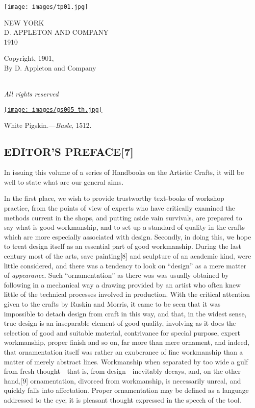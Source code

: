 \documentclass[
]{article}
\begin{document}
\texttt{[image: images/tp01.jpg]}

NEW YORK\\
D. APPLETON AND COMPANY\\
1910

{Copyright, 1901,\\
By D. Appleton and Company}\\
\strut \\
\emph{All rights reserved}

\href{images/gs005.jpg}{\texttt{[image: images/gs005\_th.jpg]}}

{White Pigskin.}---\emph{Basle}, 1512.

\hypertarget{editors-preface7}{%
\subsection[EDITOR'S
PREFACE]{\texorpdfstring{\protect\hypertarget{EDITORS_PREFACE}{}{}EDITOR'S
PREFACE{\protect\hypertarget{Page_7}{}{{[}7{]}}}}{EDITOR'S PREFACE{[}7{]}}}\label{editors-preface7}}

{In} issuing this volume of a series of Handbooks on the Artistic
Crafts, it will be well to state what are our general aims.

In the first place, we wish to provide trustworthy text-books of
workshop practice, from the points of view of experts who have
critically examined the methods current in the shops, and putting aside
vain survivals, are prepared to say what is good workmanship, and to set
up a standard of quality in the crafts which are more especially
associated with design. Secondly, in doing this, we hope to treat design
itself as an essential part of good workmanship. During the last century
most of the arts, save painting{\protect\hypertarget{Page_8}{}{{[}8{]}}}
and sculpture of an academic kind, were little considered, and there was
a tendency to look on ``design'' as a mere matter of \emph{appearance}.
Such ``ornamentation'' as there was was usually obtained by following in
a mechanical way a drawing provided by an artist who often knew little
of the technical processes involved in production. With the critical
attention given to the crafts by Ruskin and Morris, it came to be seen
that it was impossible to detach design from craft in this way, and
that, in the widest sense, true design is an inseparable element of good
quality, involving as it does the selection of good and suitable
material, contrivance for special purpose, expert workmanship, proper
finish and so on, far more than mere ornament, and indeed, that
ornamentation itself was rather an exuberance of fine workmanship than a
matter of merely abstract lines. Workmanship when separated by too wide
a gulf from fresh thought---that is, from design---inevitably decays,
and, on the other hand,{\protect\hypertarget{Page_9}{}{{[}9{]}}}
ornamentation, divorced from workmanship, is necessarily unreal, and
quickly falls into affectation. Proper ornamentation may be defined as a
language addressed to the eye; it is pleasant thought expressed in the
speech of the tool.
\end{document}
